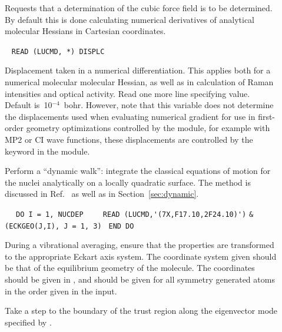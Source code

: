 \begin{description}
\item[]
Requests that a determination of the cubic force field is to be determined.
By default this is done calculating numerical derivatives of analytical
molecular Hessians in Cartesian coordinates.

\item[]\verb| |\newline
\verb|READ (LUCMD, *) DISPLC|

Displacement taken in a numerical differentiation. This applies both for a numerical molecular
molecular Hessian, as well as in calculation of Raman
intensities and optical activity.
Read one more line specifying value.  Default is~10$^{-4}$~bohr.
However,
note that this variable does not determine the displacements used
when evaluating numerical gradient for use in first-order geometry
optimizations controlled by the  module, for example with
MP2 or CI wave functions,
these displacements are controlled by the  keyword in the  module.

\item[]
Perform a ``dynamic walk'': integrate the
classical equations of motion for the nuclei
analytically on a locally
quadratic surface. The method is discussed in
Ref.~\cite{theuhjajcpl173} as well as in Section~\ref{sec:dynamic}.

\item[]\verb| |\newline
\verb| DO I = 1, NUCDEP|\newline
\verb|    READ (LUCMD,'(7X,F17.10,2F24.10)')|\newline
\verb|&        (ECKGEO(J,I), J = 1, 3)|\newline
\verb| END DO|

During a vibrational averaging, ensure that the properties are
transformed to the appropriate Eckart axis system.  The coordinate
system given should be that of the equilibrium geometry of the
molecule. The coordinates should be given in \bohr{}, and should be given
for all symmetry generated atoms in the order given in the input.

\item[] Take a step to the boundary of the trust
region
along the eigenvector mode specified by .


\end{description}
